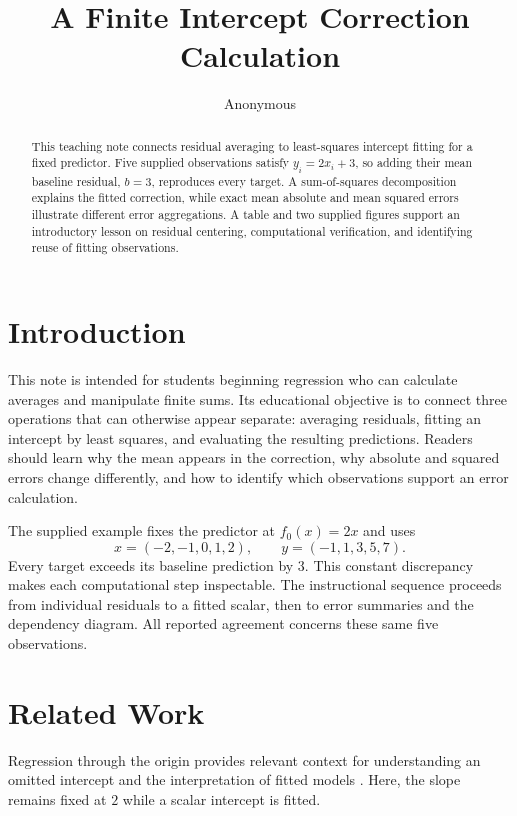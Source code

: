 \documentclass[11pt]{article}
\title{A Finite Intercept Correction Calculation}
\author{Anonymous}
\date{}
\begin{document}
\maketitle

\begin{abstract}
This teaching note connects residual averaging to least-squares intercept fitting for a fixed predictor. Five supplied observations satisfy $y_i=2x_i+3$, so adding their mean baseline residual, $b=3$, reproduces every target. A sum-of-squares decomposition explains the fitted correction, while exact mean absolute and mean squared errors illustrate different error aggregations. A table and two supplied figures support an introductory lesson on residual centering, computational verification, and identifying reuse of fitting observations.
\end{abstract}

\section{Introduction}

This note is intended for students beginning regression who can calculate averages and manipulate finite sums. Its educational objective is to connect three operations that can otherwise appear separate: averaging residuals, fitting an intercept by least squares, and evaluating the resulting predictions. Readers should learn why the mean appears in the correction, why absolute and squared errors change differently, and how to identify which observations support an error calculation.

The supplied example fixes the predictor at $f_0(x)=2x$ and uses
\[
x=(-2,-1,0,1,2),\qquad y=(-1,1,3,5,7).
\]
Every target exceeds its baseline prediction by $3$. This constant discrepancy makes each computational step inspectable. The instructional sequence proceeds from individual residuals to a fitted scalar, then to error summaries and the dependency diagram. All reported agreement concerns these same five observations.

\section{Related Work}

Regression through the origin provides relevant context for understanding an omitted intercept and the interpretation of fitted models \cite{Eisenhauer2003RegressionThrough}. Here, the slope remains fixed at $2$ while a scalar intercept is fitted.
\end{document}
